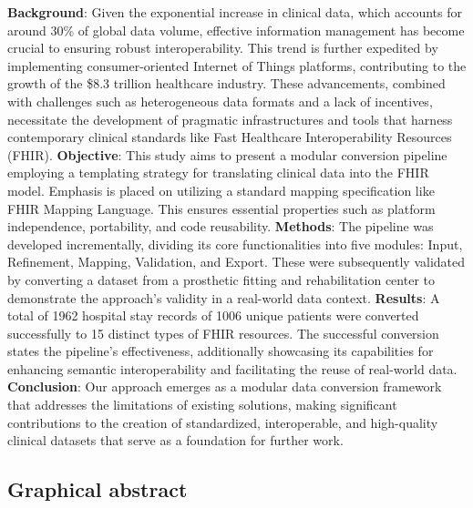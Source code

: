 \begin{paperabstract}

\textbf{Background}: Given the exponential increase in clinical data, which accounts for around 30\% of global data volume, effective information management has become crucial to ensuring robust interoperability. This trend is further expedited by implementing consumer-oriented Internet of Things platforms, contributing to the growth of the \$8.3 trillion healthcare industry. These advancements, combined with challenges such as heterogeneous data formats and a lack of incentives, necessitate the development of pragmatic infrastructures and tools that harness contemporary clinical standards like Fast Healthcare Interoperability Resources (FHIR).
\newline
\textbf{Objective}: This study aims to present a modular conversion pipeline employing a templating strategy for translating clinical data into the FHIR model. Emphasis is placed on utilizing a standard mapping specification like FHIR Mapping Language. This ensures essential properties such as platform independence, portability, and code reusability.\newline
\textbf{Methods}: The pipeline was developed incrementally, dividing its core functionalities into five modules: Input, Refinement, Mapping, Validation, and Export. These were subsequently validated by converting a dataset from a prosthetic fitting and rehabilitation center to demonstrate the approach's validity in a real-world data context.\newline
\textbf{Results}: A total of 1962 hospital stay records of 1006 unique patients were converted successfully to 15 distinct types of FHIR resources.
The successful conversion states the pipeline's effectiveness, additionally showcasing its capabilities for enhancing semantic interoperability and facilitating the reuse of real-world data.
\newline
\textbf{Conclusion}: Our approach emerges as a modular data conversion framework that addresses the limitations of existing solutions, making significant contributions to the creation of standardized, interoperable, and high-quality clinical datasets that serve as a foundation for further work.
\end{paperabstract}

\subsection*{Graphical abstract}

